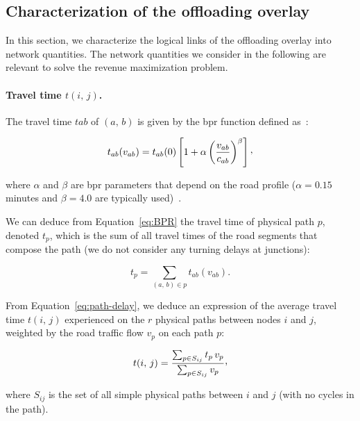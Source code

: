 \subsection{Characterization of the offloading overlay} 
\label{sec:characterization-offloading-overlay}

In this section, we characterize the logical links of the offloading overlay into network quantities. The network quantities we consider in the following are relevant to solve the revenue maximization problem.

\paragraph{Travel time $t(i,\,j)$.} 
 The travel time $t{ab}$ of $(a,\,b)$ is given by the \acrfull{bpr} function defined as~\cite{BPR64}:

\begin{equation}
  \label{eq:BPR}
  t_{ab}(v_{ab})=t_{ab}(0)\left[1+\alpha\left(\frac{v_{ab}}{c_{ab}}\right)^{\beta}\right]\Comma
\end{equation}

\noindent where $\alpha$ and $\beta$ are \acrshort{bpr} parameters that depend on the road profile ($\alpha = 0.15$ minutes and $\beta = 4.0$ are typically used)~\cite{HCM00}.

We can deduce from Equation~\ref{eq:BPR} the travel time of physical path $p$, denoted $t_{p}$, which is the sum of all travel times of the road segments that compose the path (we do not consider any turning delays at junctions):

\begin{equation}
  \label{eq:path-delay}
  t_{p} = \sum_{(a,\,b)\in p} t_{ab}(v_{ab}).
\end{equation}

From Equation~\ref{eq:path-delay}, we deduce an expression of the average travel time $t(i,\,j)$ experienced on the $r$ physical paths between nodes $i$ and $j$, weighted by the road traffic flow $v_{p}$ on each path $p$:

\begin{equation}
  \label{eq:ovelray-link-delay}
  t(i,\,j) = \frac{\sum_{p\in S_{ij}} t_{p}\,v_{p}}{\sum_{p\in S_{ij}}v_{p}}\Comma
\end{equation}

\noindent where $S_{ij}$ is the set of all simple physical paths between $i$ and $j$ (\ie with no cycles in the path).

